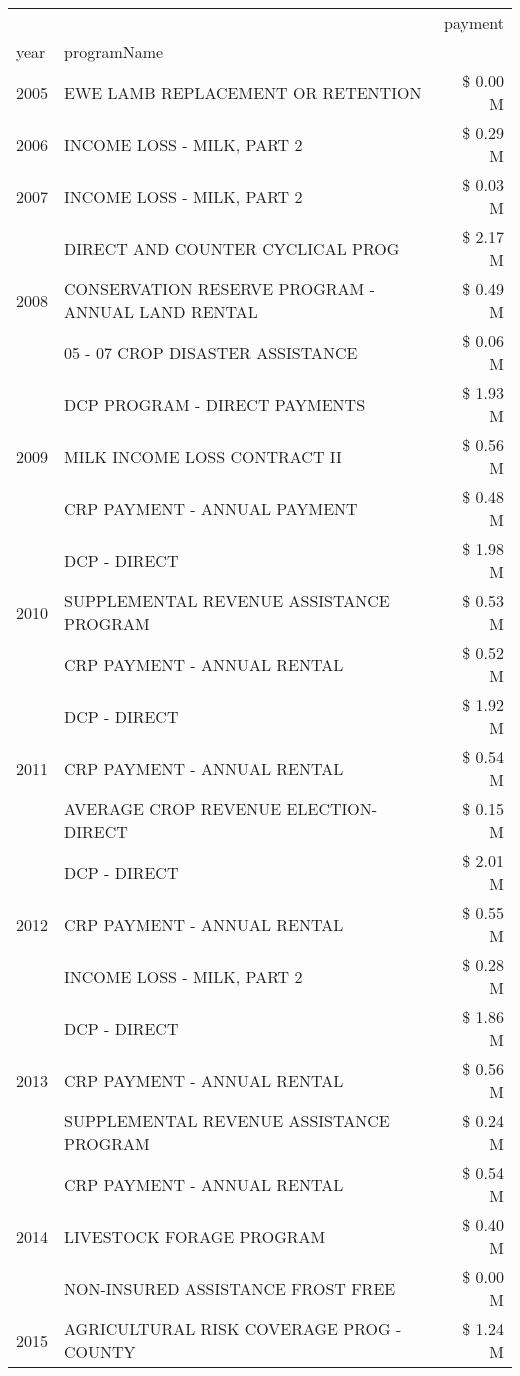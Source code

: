 \begin{tabular}{llr}
\toprule
 &  & payment \\
year & programName &  \\
\midrule
2005 & EWE LAMB REPLACEMENT OR RETENTION & \$ 0.00 M \\
\cline{1-3}
2006 & INCOME LOSS - MILK, PART 2 & \$ 0.29 M \\
\cline{1-3}
2007 & INCOME LOSS - MILK, PART 2 & \$ 0.03 M \\
\cline{1-3}
\multirow[t]{3}{*}{2008} & DIRECT AND COUNTER CYCLICAL PROG & \$ 2.17 M \\
 & CONSERVATION RESERVE PROGRAM - ANNUAL LAND RENTAL & \$ 0.49 M \\
 & 05 - 07 CROP DISASTER ASSISTANCE & \$ 0.06 M \\
\cline{1-3}
\multirow[t]{3}{*}{2009} & DCP PROGRAM - DIRECT PAYMENTS & \$ 1.93 M \\
 & MILK INCOME LOSS CONTRACT II & \$ 0.56 M \\
 & CRP PAYMENT - ANNUAL PAYMENT & \$ 0.48 M \\
\cline{1-3}
\multirow[t]{3}{*}{2010} & DCP - DIRECT & \$ 1.98 M \\
 & SUPPLEMENTAL REVENUE ASSISTANCE PROGRAM & \$ 0.53 M \\
 & CRP PAYMENT - ANNUAL RENTAL & \$ 0.52 M \\
\cline{1-3}
\multirow[t]{3}{*}{2011} & DCP - DIRECT & \$ 1.92 M \\
 & CRP PAYMENT - ANNUAL RENTAL & \$ 0.54 M \\
 & AVERAGE CROP REVENUE ELECTION-DIRECT & \$ 0.15 M \\
\cline{1-3}
\multirow[t]{3}{*}{2012} & DCP - DIRECT & \$ 2.01 M \\
 & CRP PAYMENT - ANNUAL RENTAL & \$ 0.55 M \\
 & INCOME LOSS - MILK, PART 2 & \$ 0.28 M \\
\cline{1-3}
\multirow[t]{3}{*}{2013} & DCP - DIRECT & \$ 1.86 M \\
 & CRP PAYMENT - ANNUAL RENTAL & \$ 0.56 M \\
 & SUPPLEMENTAL REVENUE ASSISTANCE PROGRAM & \$ 0.24 M \\
\cline{1-3}
\multirow[t]{3}{*}{2014} & CRP PAYMENT - ANNUAL RENTAL & \$ 0.54 M \\
 & LIVESTOCK FORAGE PROGRAM & \$ 0.40 M \\
 & NON-INSURED ASSISTANCE FROST FREE & \$ 0.00 M \\
\cline{1-3}
\multirow[t]{3}{*}{2015} & AGRICULTURAL RISK COVERAGE PROG - COUNTY & \$ 1.24 M \\

\end{tabular}
